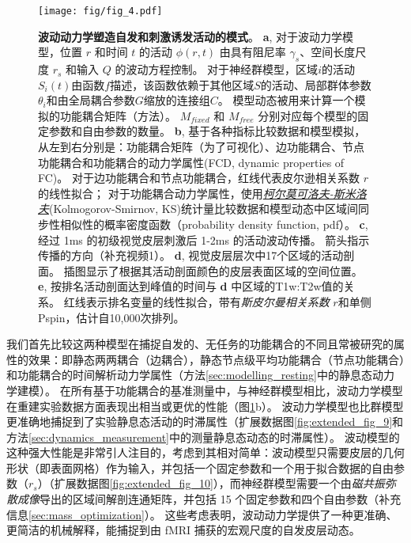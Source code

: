 \documentclass[lang=cn,a4paper,newtx]{elegantpaper}
\begin{document}
\begin{figure}[!htb]
	\centering
	\texttt{[image: fig/fig\_4.pdf]}
	\caption{\textbf{波动动力学塑造自发和刺激诱发活动的模式}。
	\textbf{a}, 对于波动力学模型，位置 $ r $ 和时间 $ t $ 的活动 $ \phi(r,t) $ 由具有阻尼率 $ \gamma_s $、空间长度尺度 $ r_s $ 和输入 $ Q $ 的波动方程控制。
	对于神经群模型，区域$ i $的活动$ S_i(t) $由函数$ f $描述，该函数依赖于其他区域$ S $的活动、局部群体参数$ \theta_i $和由全局耦合参数$ G $缩放的连接组$ C $。
	模型动态被用来计算一个模拟的功能耦合矩阵（方法）。
	$ M_{fixed} $ 和 $ M_{free} $ 分别对应每个模型的固定参数和自由参数的数量。
	\textbf{b}, 基于各种指标比较数据和模型模拟，从左到右分别是：功能耦合矩阵（为了可视化）、边功能耦合、节点功能耦合和功能耦合的动力学属性(FCD, dynamic properties of FC)。
	对于边功能耦合和节点功能耦合，红线代表皮尔逊相关系数 $ r $ 的线性拟合；
	对于功能耦合动力学属性，使用\textit{\href{https://www.cnblogs.com/jiangkejie/p/11572205.html}{柯尔莫可洛夫-斯米洛夫}}(Kolmogorov-Smirnov, KS)统计量比较数据和模型动态中区域间同步性相似性的概率密度函数（probability density function, pdf）。
	\textbf{c}, 经过 1ms 的初级视觉皮层刺激后 1-2ms 的活动波动传播。
	箭头指示传播的方向（补充视频1）。
	\textbf{d}, 视觉皮层层次中17个区域的活动剖面。
	插图显示了根据其活动剖面颜色的皮层表面区域的空间位置。
	\textbf{e}, 按排名活动剖面达到峰值的时间与 \textbf{d} 中区域的T1w:T2w值的关系。
	红线表示排名变量的线性拟合，带有\textit{斯皮尔曼相关系数} $ r $和单侧Pspin，估计自10,000次排列。
	} \label{fig:4}
\end{figure}


我们首先比较这两种模型在捕捉自发的、无任务的功能耦合的不同且常被研究的属性的效果：即静态两两耦合（边耦合），静态节点级平均功能耦合（节点功能耦合）和功能耦合的时间解析动力学属性（方法\ref{sec:modelling_resting}中的静息态动力学建模）。
在所有基于功能耦合的基准测量中，与神经群模型相比，波动力学模型在重建实验数据方面表现出相当或更优的性能（图\ref{fig:4}b）。
波动力学模型也比群模型更准确地捕捉到了实验静息态活动的时滞属性\cite{raut2021global,bolt2022parsimonious,mitra2015lag}（扩展数据图\ref{fig:extended_fig_9}和方法\ref{sec:dynamics_measurement}中的测量静息态动态的时滞属性）。
波动模型的这种强大性能是非常引人注目的，考虑到其相对简单：波动模型只需要皮层的几何形状（即表面网格）作为输入，并包括一个固定参数和一个用于拟合数据的自由参数（$ r_s $）（扩展数据图\ref{fig:extended_fig_10}），而神经群模型需要一个由\textit{磁共振弥散成像}导出的区域间解剖连通矩阵，并包括 15 个固定参数和四个自由参数（补充信息\ref{sec:mass_optimization}）。
这些考虑表明，波动动力学提供了一种更准确、更简洁的机械解释，能捕捉到由 fMRI 捕获的宏观尺度的自发皮层动态。
\end{document}
